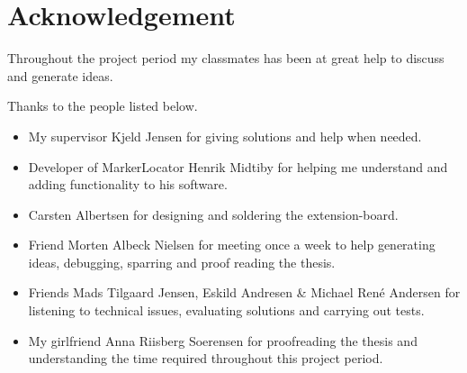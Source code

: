 \section*{Acknowledgement}
Throughout the project period my classmates has been at great help to discuss and generate ideas.

Thanks to the people listed below.
\begin{itemize}
	\item My supervisor Kjeld Jensen for giving solutions and help when needed.
	\item Developer of MarkerLocator Henrik Midtiby for helping me understand and adding functionality to his software.
	\item Carsten Albertsen for designing and soldering the extension-board.
	\item Friend Morten Albeck Nielsen for meeting once a week to help generating ideas, debugging, sparring and proof reading the thesis.
	\item Friends Mads Tilgaard Jensen, Eskild Andresen \& Michael René Andersen for listening to technical issues, evaluating solutions and carrying out tests.
	\item My girlfriend Anna Riisberg Soerensen for proofreading the thesis and understanding the time required throughout this project period.
\end{itemize}
